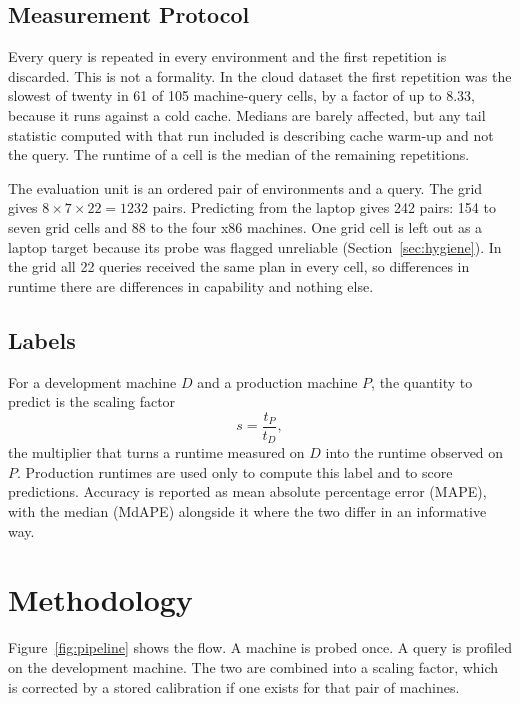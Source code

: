 \documentclass[runningheads]{llncs}
\begin{document}
\subsection{Measurement Protocol}

Every query is repeated in every environment and the first repetition is
discarded. This is not a formality. In the cloud dataset the first repetition
was the slowest of twenty in 61 of 105 machine-query cells, by a factor of up
to 8.33, because it runs against a cold cache. Medians are barely affected,
but any tail statistic computed with that run included is describing cache
warm-up and not the query. The runtime of a cell is the median of the
remaining repetitions.

The evaluation unit is an ordered pair of environments and a query. The grid
gives $8 \times 7 \times 22 = 1232$ pairs. Predicting from the laptop gives
242 pairs: 154 to seven grid cells and 88 to the four x86 machines. One grid
cell is left out as a laptop target because its probe was flagged unreliable
(Section~\ref{sec:hygiene}). In the grid all 22 queries received the same
plan in every cell, so differences in runtime there are differences in
capability and nothing else.

\subsection{Labels}

For a development machine $D$ and a production machine $P$, the quantity to
predict is the scaling factor
\begin{equation}
s = \frac{t_{P}}{t_{D}},
\end{equation}
the multiplier that turns a runtime measured on $D$ into the runtime observed
on $P$. Production runtimes are used only to compute this label and to score
predictions. Accuracy is reported as mean absolute percentage error (MAPE),
with the median (MdAPE) alongside it where the two differ in an informative
way.

\section{Methodology}

Figure~\ref{fig:pipeline} shows the flow. A machine is probed once. A query is
profiled on the development machine. The two are combined into a scaling
factor, which is corrected by a stored calibration if one exists for that
pair of machines.
\end{document}
